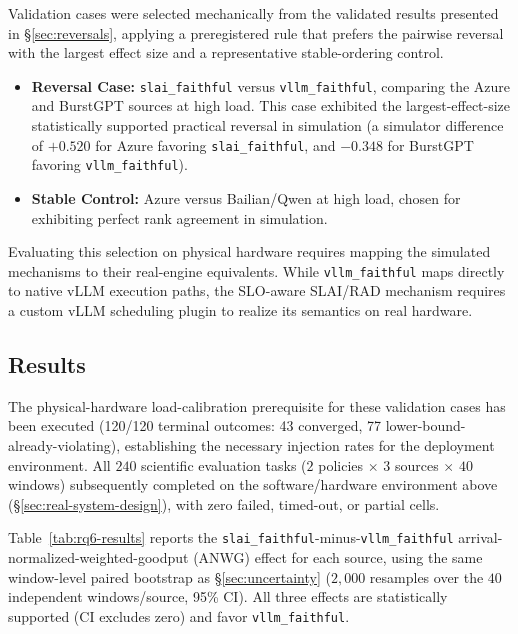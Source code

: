 Validation cases were selected mechanically from the validated results presented in \S\ref{sec:reversals}, applying a preregistered rule that prefers the pairwise reversal with the largest effect size and a representative stable-ordering control.

\begin{itemize}
  \item \textbf{Reversal Case:} \texttt{slai\_faithful} versus \texttt{vllm\_faithful}, comparing the Azure and BurstGPT sources at high load. This case exhibited the largest-effect-size statistically supported practical reversal in simulation (a simulator difference of $+0.520$ for Azure favoring \texttt{slai\_faithful}, and $-0.348$ for BurstGPT favoring \texttt{vllm\_faithful}).
  \item \textbf{Stable Control:} Azure versus Bailian/Qwen at high load, chosen for exhibiting perfect rank agreement in simulation.
\end{itemize}

Evaluating this selection on physical hardware requires mapping the simulated mechanisms to their real-engine equivalents. While \texttt{vllm\_faithful} maps directly to native vLLM execution paths, the SLO-aware SLAI/RAD mechanism requires a custom vLLM scheduling plugin to realize its semantics on real hardware.

\subsection{Results}
\label{sec:real-system-result}

The physical-hardware load-calibration prerequisite for these validation cases has been executed (120/120 terminal outcomes: 43 converged, 77 lower-bound-already-violating), establishing the necessary injection rates for the deployment environment. All $240$ scientific evaluation tasks ($2$ policies $\times$ $3$ sources $\times$ $40$ windows) subsequently completed on the software/hardware environment above (\S\ref{sec:real-system-design}), with zero failed, timed-out, or partial cells.

Table~\ref{tab:rq6-results} reports the \texttt{slai\_faithful}-minus-\texttt{vllm\_faithful} arrival-normalized-weighted-goodput (ANWG) effect for each source, using the same window-level paired bootstrap as \S\ref{sec:uncertainty} ($2{,}000$ resamples over the $40$ independent windows/source, 95\% CI). All three effects are statistically supported (CI excludes zero) and favor \texttt{vllm\_faithful}.

